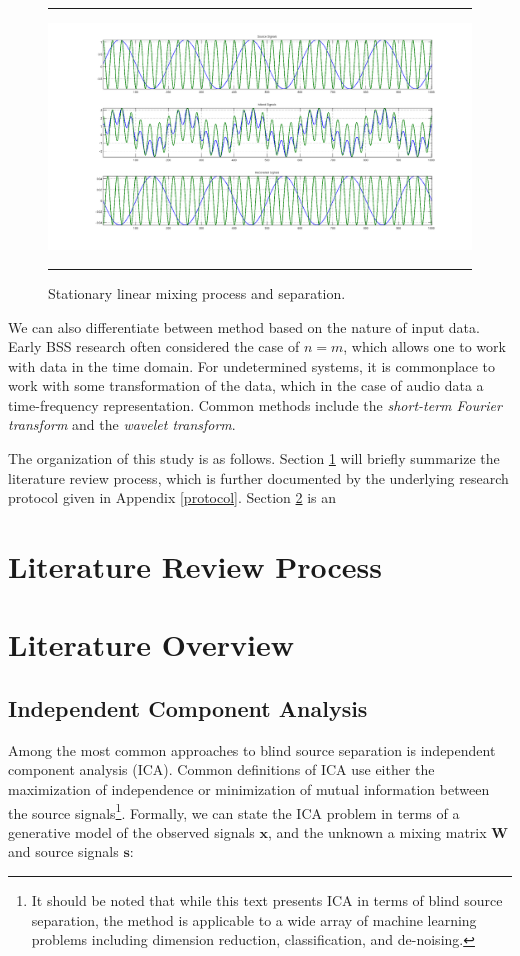 \documentclass[11pt, oneside, a4paper]{article}
\begin{document}
\begin{figure}
  \centering
  \hrule
  \includegraphics[width = .9\textwidth]{ica_simple}
  \hrule
  \caption{Stationary linear mixing process and separation.}
  \label{pca_time_series}
\end{figure}

We can also differentiate between method based on the nature of input
data. Early BSS research often considered the case of $n=m$, which
allows one to work with data in the time domain. For undetermined
systems, it is commonplace to work with some transformation of the
data, which in the case of audio data a time-frequency
representation. Common methods include the \emph{short-term Fourier
  transform} and the \emph{wavelet transform}.


The organization of this study is as follows. Section
\ref{reviewProcess} will briefly summarize the literature review
process, which is further documented by the underlying research
protocol given in Appendix \ref{protocol}. Section \ref{overview} is
an 

\section{Literature Review Process}\label{reviewProcess} %



\section{Literature Overview}\label{overview}



\subsection{Independent Component Analysis} %

Among the most common approaches to blind source separation is
independent component analysis (ICA). Common definitions of ICA use
either the maximization of independence or minimization of mutual information between the source
signals\footnote{It should be noted that while this text presents ICA
  in terms of blind source separation, the method is applicable to a
  wide array of machine learning problems including dimension
  reduction, classification, and de-noising.}. Formally, we can state
the ICA problem in terms of a generative model of the observed signals
$\mathbf{x}$, and the unknown a mixing matrix $\mathbf{W}$ and source
signals $\mathbf{s}$:
\end{document}
